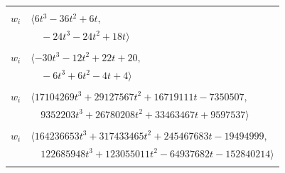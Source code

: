 \documentclass[11pt]{article}
\begin{document}
\begin{longtable}{@{}ll@{}}
\addlinespace[2pt]
\multicolumn{2}{@{}p{0.97\textwidth}@{}}{$i=27$, $D_i=2$, $\rho_{ij}$: $12{:}1, \allowbreak 18{:}1, \allowbreak 34{:}1, \allowbreak 36{:}2, \allowbreak 48{:}1, \allowbreak 53{:}1, \allowbreak 55{:}1, \allowbreak 71{:}1$}\\
$w_i$ & $\langle 6t^{3}-36t^{2}+6t,$\\
 & $\quad -24t^{3}-24t^{2}+18t\rangle$\\
\addlinespace[2pt]
\multicolumn{2}{@{}p{0.97\textwidth}@{}}{$i=28$, $D_i=2$, $\rho_{ij}$: $2{:}1, \allowbreak 8{:}1, \allowbreak 9{:}2, \allowbreak 20{:}1, \allowbreak 33{:}2, \allowbreak 35{:}1, \allowbreak 63{:}2, \allowbreak 67{:}1$}\\
$w_i$ & $\langle -30t^{3}-12t^{2}+22t+20,$\\
 & $\quad -6t^{3}+6t^{2}-4t+4\rangle$\\
\addlinespace[2pt]
\multicolumn{2}{@{}p{0.97\textwidth}@{}}{$i=29$, $D_i=64$, $\rho_{ij}$: $0{:}1, \allowbreak 7{:}1, \allowbreak 10{:}2, \allowbreak 11{:}1, \allowbreak 12{:}2, \allowbreak 16{:}2, \allowbreak 21{:}1, \allowbreak 23{:}2, \allowbreak 26{:}1, \allowbreak 32{:}2, \allowbreak 33{:}1, \allowbreak 35{:}1, \allowbreak 41{:}2, \allowbreak 49{:}2, \allowbreak 54{:}1, \allowbreak 57{:}2, \allowbreak 59{:}2, \allowbreak 61{:}2, \allowbreak 63{:}1, \allowbreak 66{:}1$}\\
$w_i$ & $\langle 17104269t^{3}+29127567t^{2}+16719111t-7350507,$\\
 & $\quad 9352203t^{3}+26780208t^{2}+33463467t+9597537\rangle$\\
\addlinespace[2pt]
\multicolumn{2}{@{}p{0.97\textwidth}@{}}{$i=30$, $D_i=256$, $\rho_{ij}$: $0{:}1, \allowbreak 1{:}1, \allowbreak 5{:}2, \allowbreak 10{:}1, \allowbreak 11{:}2, \allowbreak 13{:}2, \allowbreak 15{:}2, \allowbreak 16{:}1, \allowbreak 19{:}2, \allowbreak 21{:}1, \allowbreak 24{:}1, \allowbreak 26{:}2, \allowbreak 31{:}2, \allowbreak 37{:}2, \allowbreak 41{:}2, \allowbreak 42{:}1, \allowbreak 48{:}2, \allowbreak 51{:}2, \allowbreak 57{:}2, \allowbreak 61{:}1, \allowbreak 63{:}1, \allowbreak 65{:}1$}\\
$w_i$ & $\langle 164236653t^{3}+317433465t^{2}+245467683t-19494999,$\\
 & $\quad 122685948t^{3}+123055011t^{2}-64937682t-152840214\rangle$\\
\addlinespace[2pt]
\multicolumn{2}{@{}p{0.97\textwidth}@{}}{$i=31$, $D_i=16$, $\rho_{ij}$: $8{:}1, \allowbreak 12{:}1, \allowbreak 20{:}2, \allowbreak 26{:}2, \allowbreak 30{:}1, \allowbreak 37{:}2, \allowbreak 41{:}1, \allowbreak 45{:}1, \allowbreak 48{:}1, \allowbreak 57{:}2, \allowbreak 60{:}1, \allowbreak 70{:}1$}\\

\end{longtable}
\end{document}
